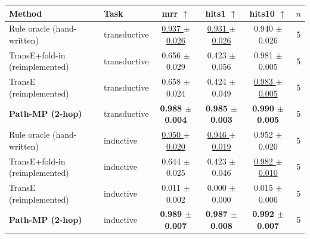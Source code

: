 \begin{tabular}{llcccc}
\toprule
Method & Task & mrr $\uparrow$ & hits1 $\uparrow$ & hits10 $\uparrow$ & $n$ \\
\midrule
Rule oracle (hand-written) & transductive & \underline{0.937 $\pm$ 0.026} & \underline{0.931 $\pm$ 0.026} & 0.940 $\pm$ 0.026 & 5 \\
TransE+fold-in (reimplemented) & transductive & 0.656 $\pm$ 0.029 & 0.423 $\pm$ 0.056 & 0.981 $\pm$ 0.005 & 5 \\
TransE (reimplemented) & transductive & 0.658 $\pm$ 0.024 & 0.424 $\pm$ 0.049 & \underline{0.983 $\pm$ 0.005} & 5 \\
\textbf{Path-MP (2-hop)} & transductive & \textbf{0.988 $\pm$ 0.004} & \textbf{0.985 $\pm$ 0.003} & \textbf{0.990 $\pm$ 0.005} & 5 \\
\midrule
Rule oracle (hand-written) & inductive & \underline{0.950 $\pm$ 0.020} & \underline{0.946 $\pm$ 0.019} & 0.952 $\pm$ 0.020 & 5 \\
TransE+fold-in (reimplemented) & inductive & 0.644 $\pm$ 0.025 & 0.423 $\pm$ 0.046 & \underline{0.982 $\pm$ 0.010} & 5 \\
TransE (reimplemented) & inductive & 0.011 $\pm$ 0.002 & 0.000 $\pm$ 0.000 & 0.015 $\pm$ 0.006 & 5 \\
\textbf{Path-MP (2-hop)} & inductive & \textbf{0.989 $\pm$ 0.007} & \textbf{0.987 $\pm$ 0.008} & \textbf{0.992 $\pm$ 0.007} & 5 \\
\bottomrule
\end{tabular}
